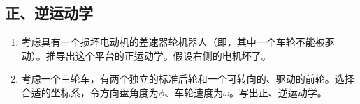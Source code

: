\subsection*{正、逆运动学}
\begin{enumerate}

\item 考虑具有一个损坏电动机的差速器轮机器人（即，其中一个车轮不能被驱动）。推导出这个平台的正运动学。假设右侧的电机坏了。
\item 考虑一个三轮车，有两个独立的标准后轮和一个可转向的、驱动的前轮。选择合适的坐标系，令方向盘角度为$\phi$、车轮速度为$\dot{\omega}$。写出正、逆运动学。
\end{enumerate}
\normalsize